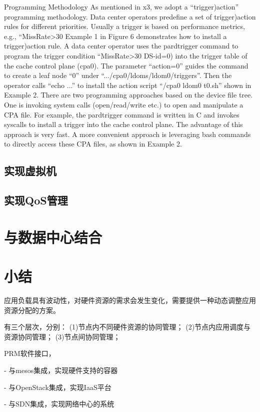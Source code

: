 Programming Methodology
As mentioned in x3, we adopt a “trigger)action” programming
methodology. Data center operators predefine a set of trigger)action
rules for different priorities. Usually a trigger is based on performance
metrics, e.g., “MissRate>30%
Example 1 in Figure 6 demonstrates how to install a trigger)action
rule. A data center operator uses the pardtrigger command to program
the trigger condition “MissRate>30%
DS-id=0) into the trigger table of the cache control plane (cpa0).
The parameter “action=0” guides the command to create a leaf
node “0” under “.../cpa0/ldoms/ldom0/triggers”. Then the operator
calls “echo ...” to install the action script “/cpa0 ldom0 t0.sh”
shown in Example 2.
There are two programming approaches based on the device file
tree. One is invoking system calls (open/read/write etc.) to open
and manipulate a CPA file. For example, the pardtrigger command
is written in C and invokes syscalls to install a trigger into the
cache control plane. The advantage of this approach is very fast. A
more convenient approach is leveraging bash commands to directly
access these CPA files, as shown in Example 2.


\subsection{实现虚拟机}


\subsection{实现QoS管理}


\section{与数据中心结合}



\section{小结}


应用负载具有波动性，对硬件资源的需求会发生变化，需要提供一种动态调整应用资源分配的方案。

有三个层次，分别：
(1)节点内不同硬件资源的协同管理；
(2)节点内应用调度与资源协同管理；
(3)节点间协同管理；


PRM软件接口，

- 与mesos集成，实现硬件支持的容器

- 与OpenStack集成，实现IaaS平台

- 与SDN集成，实现网络中心的系统


